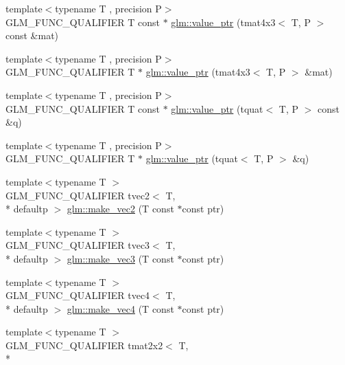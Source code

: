 \begin{DoxyCompactItemize}
\item 
{\footnotesize template$<$typename T , precision P$>$ }\\G\-L\-M\-\_\-\-F\-U\-N\-C\-\_\-\-Q\-U\-A\-L\-I\-F\-I\-E\-R T const $\ast$ \hyperlink{group__gtc__type__ptr_ga72b0a496d6c190645accac32f48f64bb}{glm\-::value\-\_\-ptr} (tmat4x3$<$ T, P $>$ const \&mat)
\item 
{\footnotesize template$<$typename T , precision P$>$ }\\G\-L\-M\-\_\-\-F\-U\-N\-C\-\_\-\-Q\-U\-A\-L\-I\-F\-I\-E\-R T $\ast$ \hyperlink{group__gtc__type__ptr_gab9cba81cd8a7eb0afc9ac2b9f4fe05ca}{glm\-::value\-\_\-ptr} (tmat4x3$<$ T, P $>$ \&mat)
\item 
{\footnotesize template$<$typename T , precision P$>$ }\\G\-L\-M\-\_\-\-F\-U\-N\-C\-\_\-\-Q\-U\-A\-L\-I\-F\-I\-E\-R T const $\ast$ \hyperlink{group__gtc__type__ptr_ga26a38ff14840b35c57fa937711c5168c}{glm\-::value\-\_\-ptr} (tquat$<$ T, P $>$ const \&q)
\item 
{\footnotesize template$<$typename T , precision P$>$ }\\G\-L\-M\-\_\-\-F\-U\-N\-C\-\_\-\-Q\-U\-A\-L\-I\-F\-I\-E\-R T $\ast$ \hyperlink{group__gtc__type__ptr_ga637414d7a9e8877e66a59f3b3d700898}{glm\-::value\-\_\-ptr} (tquat$<$ T, P $>$ \&q)
\item 
{\footnotesize template$<$typename T $>$ }\\G\-L\-M\-\_\-\-F\-U\-N\-C\-\_\-\-Q\-U\-A\-L\-I\-F\-I\-E\-R tvec2$<$ T, \\*
defaultp $>$ \hyperlink{group__gtc__type__ptr_ga5f7393c30970c5949be13ceb525093a6}{glm\-::make\-\_\-vec2} (T const $\ast$const ptr)
\item 
{\footnotesize template$<$typename T $>$ }\\G\-L\-M\-\_\-\-F\-U\-N\-C\-\_\-\-Q\-U\-A\-L\-I\-F\-I\-E\-R tvec3$<$ T, \\*
defaultp $>$ \hyperlink{group__gtc__type__ptr_ga86f4bc63570db86346db2e567fb760f6}{glm\-::make\-\_\-vec3} (T const $\ast$const ptr)
\item 
{\footnotesize template$<$typename T $>$ }\\G\-L\-M\-\_\-\-F\-U\-N\-C\-\_\-\-Q\-U\-A\-L\-I\-F\-I\-E\-R tvec4$<$ T, \\*
defaultp $>$ \hyperlink{group__gtc__type__ptr_ga152345176b8951c15711f6ed4f6fc237}{glm\-::make\-\_\-vec4} (T const $\ast$const ptr)
\item 
{\footnotesize template$<$typename T $>$ }\\G\-L\-M\-\_\-\-F\-U\-N\-C\-\_\-\-Q\-U\-A\-L\-I\-F\-I\-E\-R tmat2x2$<$ T, \\*

\end{DoxyCompactItemize}

